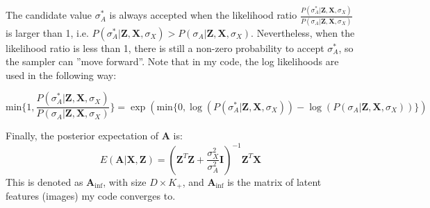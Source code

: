 The candidate value $\sigma_{A}^{*}$ is always accepted when the likelihood ratio $\frac{P(\sigma_{A}^{*} | \mathbf{Z,X},\sigma_X)}{P(\sigma_{A} | \mathbf{Z,X},\sigma_X)}$ is larger than 1, i.e. $P(\sigma_{A}^{*} | \mathbf{Z,X},\sigma_X) > P(\sigma_{A} | \mathbf{Z,X},\sigma_X)$. Nevertheless, when the likelihood ratio is less than 1, there is still a non-zero probability to accept $\sigma_{A}^{*}$, so the sampler can ''move forward''. Note that in my code, the log likelihoods are used in the following way:

\begin{equation}
\text{min}\{ 1, \dfrac{P(\sigma_{A}^{*} | \mathbf{Z,X},\sigma_X)}{P(\sigma_{A} | \mathbf{Z,X},\sigma_X)} \} = \exp(\text{min}\{0, \log(P(\sigma_{A}^{*} | \mathbf{Z,X},\sigma_X)) - \log(P(\sigma_{A} | \mathbf{Z,X},\sigma_X))\})
\end{equation}

Finally, the posterior expectation of $\mathbf{A}$ is:
\begin{equation}
E(\mathbf{A}|\mathbf{X,Z}) = (\mathbf{Z}^T\mathbf{Z}+\frac{\sigma_X^2}{\sigma_A^2}\mathbf{I})^{-1} \mathbf{Z}^T \mathbf{X}
\end{equation}
This is denoted as $\mathbf{A}_{\text{inf}}$, with size $D \times K_+$, and $\mathbf{A}_{\text{inf}}$ is the matrix of latent features (images) my code converges to.
